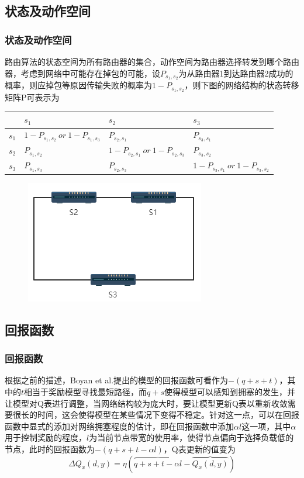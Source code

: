 \documentclass[hyperref={pdfpagelabels=false}]{beamer}
\begin{document}
\subsection{状态及动作空间}
\begin{frame}
	\frametitle{状态及动作空间}
	路由算法的状态空间为所有路由器的集合，动作空间为路由器选择转发到哪个路由器，考虑到网络中可能存在掉包的可能，设$P_{s_1,s_2}$为从路由器1到达路由器2成功的概率，则应掉包等原因传输失败的概率为$1-P_{s_1,s_2}$，则下图的网络结构的状态转移矩阵P可表示为

	\begin{table}[]\small
		\begin{tabular}{|l|l|l|l|}
		\hline
		      & $s_1$                             & $s_2$                              & $s_3$ \\ \hline
		$s_1$ & $1-P_{s_1,s_2}\ or\ 1 -P_{s_1,s_3}$  & $P_{s_2,s_1}$                      & $P_{s_3,s_1}$  \\ \hline
		$s_2$ & $P_{s_1,s_2}$                     & $1-P_{s_2,s_1}\ or\ 1-P_{s_2,s_3}$   & $P_{s_3,s_2}$  \\ \hline
		$s_3$ & $P_{s_1,s_3}$                     & $P_{s_2,s_3}$                      & $1-P_{s_3,s_1}\ or\ 1-P_{s_3,s_2}$  \\ \hline
		\end{tabular}
	\end{table}

	\begin{figure}
		\centering
		\includegraphics[width=.4\textwidth]{./figure/1.png}
	\end{figure}
\end{frame}



\subsection{回报函数}
\begin{frame}
	\frametitle{回报函数}
	根据之前的描述，Boyan et al.\cite{boyan1994packet}提出的模型的回报函数可看作为$-(q+s+t)$，其中的$t$相当于奖励模型寻找最短路径，而$q+s$使得模型可以感知到拥塞的发生，并让模型对Q表进行调整，当网络结构较为庞大时，要让模型更新Q表以重新收敛需要很长的时间，这会使得模型在某些情况下变得不稳定。针对这一点，可以在回报函数中显式的添加对网络拥塞程度的估计，即在回报函数中添加$\alpha l$这一项，其中$\alpha$用于控制奖励的程度，$l$为当前节点带宽的使用率，使得节点偏向于选择负载低的节点，此时的回报函数为$-(q+s+t-\alpha l)$，Q表更新的值变为
	\[
		\Delta Q_{x}(d, y)=\eta(\overbrace{q+s+t-\alpha l}-\overbrace{Q_{x}(d, y)})
	\]
\end{frame}
\end{document}
